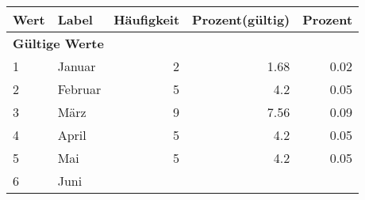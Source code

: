      \begin{longtable}{lXrrr}
     \toprule
     \textbf{Wert} & \textbf{Label} & \textbf{Häufigkeit} & \textbf{Prozent(gültig)} & \textbf{Prozent} \\
     \endhead
     \midrule
     \multicolumn{5}{l}{\textbf{Gültige Werte}}\\

     1 &
     \multicolumn{1}{X}{ Januar   } &


       \num{2} &
       \num[round-mode=places,round-precision=2]{1.68} &
         \num[round-mode=places,round-precision=2]{0.02} \\

     2 &
     \multicolumn{1}{X}{ Februar   } &


       \num{5} &
       \num[round-mode=places,round-precision=2]{4.2} &
         \num[round-mode=places,round-precision=2]{0.05} \\

     3 &
     \multicolumn{1}{X}{ März   } &


       \num{9} &
       \num[round-mode=places,round-precision=2]{7.56} &
         \num[round-mode=places,round-precision=2]{0.09} \\

     4 &
     \multicolumn{1}{X}{ April   } &


       \num{5} &
       \num[round-mode=places,round-precision=2]{4.2} &
         \num[round-mode=places,round-precision=2]{0.05} \\

     5 &
     \multicolumn{1}{X}{ Mai   } &


       \num{5} &
       \num[round-mode=places,round-precision=2]{4.2} &
         \num[round-mode=places,round-precision=2]{0.05} \\

     6 &
     \multicolumn{1}{X}{ Juni   } &



\end{longtable}
